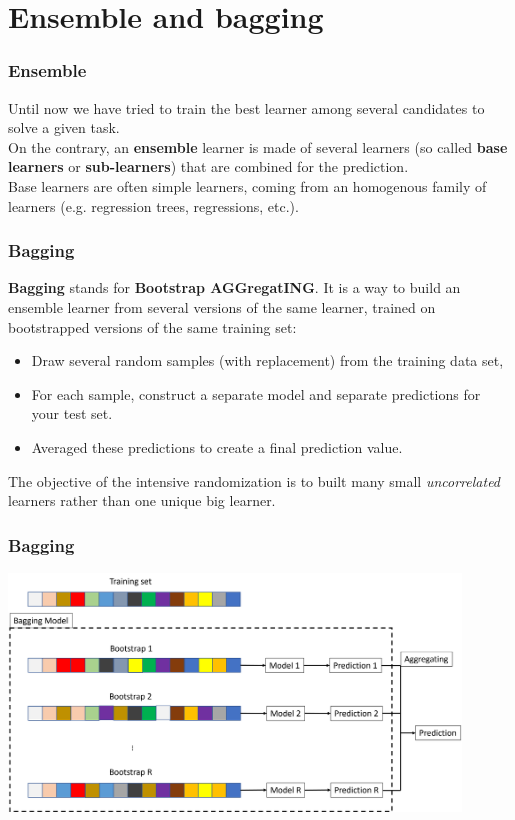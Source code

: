 \section{Ensemble and bagging}
\begin{frame}
\frametitle{Ensemble}
Until now we have tried to train the best learner among several candidates to solve a given task. \\
\vspace{0.2cm}
On the contrary, an {\bf ensemble} learner is made of several learners (so called {\bf base learners} or {\bf sub-learners}) that are combined for the prediction. \\
\vspace{0.2cm}
Base learners are often simple learners, coming from an homogenous family of learners (e.g. regression trees, regressions, etc.). 
\end{frame}
\begin{frame}
\frametitle{Bagging}
{\bf Bagging} stands for {\bf Bootstrap AGGregatING}. It is a way to build an ensemble learner from several versions of the same learner, trained on bootstrapped versions of the same training set: 
\begin{itemize}
\item Draw several random samples (with replacement) from the training data set, 
\item For each sample, construct a separate model and separate predictions for your test set.
\item Averaged these predictions to create a final prediction value.
\end{itemize}
The objective of the intensive randomization is to built many small {\it uncorrelated} learners rather than one unique big learner.
\end{frame}
\begin{frame}
\frametitle{Bagging}
\begin{center}
\includegraphics[width=12cm]{../Graphs/Bagging.png}
\end{center}
\end{frame}
